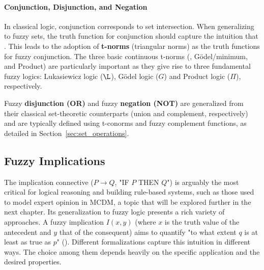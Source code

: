 \paragraph{Conjunction, Disjunction, and Negation}In classical logic, conjunction corresponds to set intersection. When generalizing to fuzzy sets, the truth function for conjunction should capture the intuition that \cite[p.27]{Hajek1998}. This leads to the adoption of \textbf{t-norms} (triangular norms) as the truth functions for fuzzy conjunction. The three basic continuous t-norms (\luka, Gödel/minimum, and Product) are particularly important as they give rise to three fundamental fuzzy logics: Lukasiewicz logic ($\L$), Gödel logic ($G$) and Product logic ($\Pi$), respectively. 

Fuzzy \textbf{disjunction (OR)} and fuzzy \textbf{negation (NOT)} are generalized from their classical set-theoretic counterparts (union and complement, respectively) and are typically defined using t-conorms and fuzzy complement functions, as detailed in Section~\ref{sec:set_operations}.

\subsection{Fuzzy Implications}


The implication connective ($P \rightarrow Q$, "IF $P$ THEN $Q$") is arguably the most critical for logical reasoning and building rule-based systems, such as those used to model expert opinion in MCDM, a topic that will be explored further in the next chapter. Its generalization to fuzzy logic presents a rich variety of approaches. A fuzzy implication $I(x,y)$ (where $x$ is the truth value of the antecedent and $y$ that of the consequent) aims to quantify "to what extent $q$ is at least as true as $p$" (\cite[p.57]{FULLER2}). Different formalizations capture this intuition in different ways. The choice among them depends heavily on the specific application and the desired properties.

